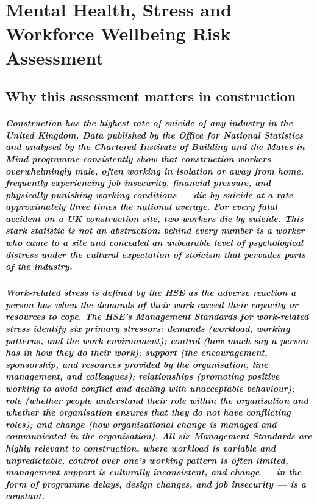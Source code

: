 \chapter{Mental Health, Stress and Workforce Wellbeing Risk Assessment}
\label{chap:Mental Health, Stress and Workforce Wellbeing Risk Assessment}

\section{Why this assessment matters in construction}

\paragraph{Construction has the highest rate of suicide of any industry in the United Kingdom. Data published by the Office for National Statistics and analysed by the Chartered Institute of Building and the Mates in Mind programme consistently show that construction workers --- overwhelmingly male, often working in isolation or away from home, frequently experiencing job insecurity, financial pressure, and physically punishing working conditions --- die by suicide at a rate approximately three times the national average. For every fatal accident on a UK construction site, two workers die by suicide. This stark statistic is not an abstraction: behind every number is a worker who came to a site and concealed an unbearable level of psychological distress under the cultural expectation of stoicism that pervades parts of the industry.}

\paragraph{Work-related stress is defined by the HSE as the adverse reaction a person has when the demands of their work exceed their capacity or resources to cope. The HSE's Management Standards for work-related stress identify six primary stressors: demands (workload, working patterns, and the work environment); control (how much say a person has in how they do their work); support (the encouragement, sponsorship, and resources provided by the organisation, line management, and colleagues); relationships (promoting positive working to avoid conflict and dealing with unacceptable behaviour); role (whether people understand their role within the organisation and whether the organisation ensures that they do not have conflicting roles); and change (how organisational change is managed and communicated in the organisation). All six Management Standards are highly relevant to construction, where workload is variable and unpredictable, control over one's working pattern is often limited, management support is culturally inconsistent, and change --- in the form of programme delays, design changes, and job insecurity --- is a constant.}

